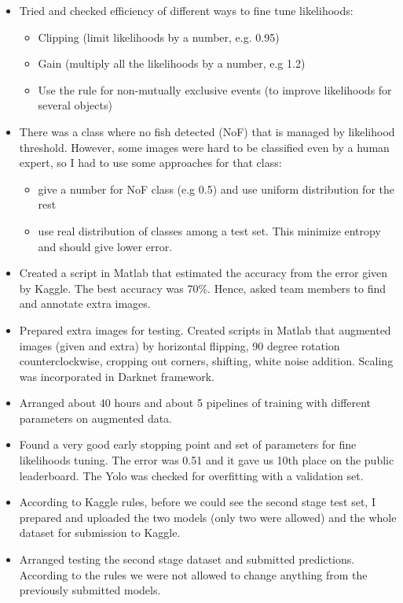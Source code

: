 \documentclass[a4paper]{article}
\begin{document}
\begin{itemize}
	\item Tried and checked efficiency of different ways to fine tune likelihoods:
	\begin{itemize}
		\item Clipping (limit likelihoods by a number, e.g. 0.95) 
		\item Gain (multiply all the likelihoods by a number, e.g 1.2)
		\item Use the rule for non-mutually exclusive events (to improve likelihoods for several objects)
	\end{itemize}
	\item There was a class where no fish detected (NoF) that is managed by likelihood threshold. However, some images were hard to be classified even by a human expert, so I had to use some approaches for that class:
	\begin{itemize}
		\item give a number for NoF class (e.g 0.5) and use uniform distribution for the rest
		\item use real distribution of classes among a test set. This minimize entropy and should give lower error.
	\end{itemize}
	\item Created a script in Matlab that estimated the accuracy from the error given by Kaggle. The best accuracy was 70\%. Hence, asked team members to find and annotate extra images.
	\item Prepared extra images for testing. Created scripts in Matlab that augmented images (given and extra) by horizontal flipping, 90 degree rotation counterclockwise, cropping out corners, shifting, white noise addition. Scaling was incorporated in Darknet framework.
	\item Arranged about 40 hours and about 5 pipelines of training with different parameters on augmented data. 
	\item Found a very good early stopping point and set of parameters for fine likelihoods tuning. The error was 0.51 and it gave us 10th place on the public leaderboard. The Yolo was checked for overfitting with a validation set. 
	\item According to Kaggle rules, before we could see the second stage test set, I prepared and uploaded the two models (only two were allowed) and the whole dataset for submission to Kaggle.
	\item Arranged testing the second stage dataset and submitted predictions. According to the rules we were not allowed to change anything from the previously submitted models.

\end{itemize}
\end{document}
